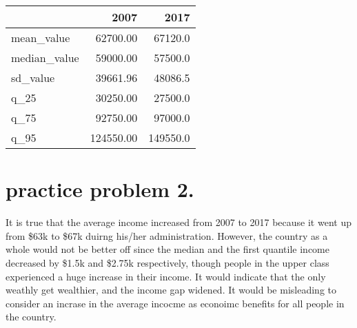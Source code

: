 \documentclass[
]{article}
\begin{document}
\begin{longtable}[]{@{}lrr@{}}
\toprule
& 2007 & 2017\tabularnewline
\midrule
\endhead
mean\_value & 62700.00 & 67120.0\tabularnewline
median\_value & 59000.00 & 57500.0\tabularnewline
sd\_value & 39661.96 & 48086.5\tabularnewline
q\_25 & 30250.00 & 27500.0\tabularnewline
q\_75 & 92750.00 & 97000.0\tabularnewline
q\_95 & 124550.00 & 149550.0\tabularnewline
\bottomrule
\end{longtable}

\hypertarget{practice-problem-2.}{%
\section{practice problem 2.}\label{practice-problem-2.}}

It is true that the average income increased from 2007 to 2017 because
it went up from \$63k to \$67k duirng his/her administration. However,
the country as a whole would not be better off since the median and the
first quantile income decreased by \$1.5k and \$2.75k respectively,
though people in the upper class experienced a huge increase in their
income. It would indicate that the only weathly get wealthier, and the
income gap widened. It would be misleading to consider an incrase in the
average incocme as econoimc benefits for all people in the country.
\end{document}
